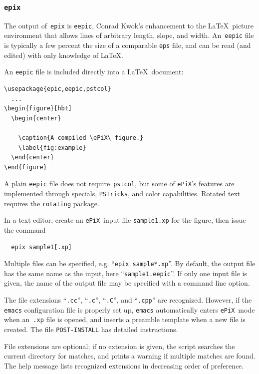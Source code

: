 \documentclass[12pt]{report}
\newcommand{\code}[1]{\texttt{#1}}
\newcommand{\filename}[1]{\texttt{#1}}
\newcommand{\ePiX}{\code{ePiX}}
\begin{document}
\subsubsection*{\code{epix}}

The output of~\code{epix} is \filename{eepic}, Conrad Kwok's
enhancement to the \LaTeX\ picture environment that allows lines of
arbitrary length, slope, and width. An~\filename{eepic} file is
typically a few percent the size of a comparable \filename{eps} file,
and can be read (and edited) with only knowledge of \LaTeX.

An \filename{eepic} file is included directly into a \LaTeX\ document:
\begin{verbatim}
\usepackage{epic,eepic,pstcol}
  ...
\begin{figure}[hbt]
  \begin{center}
    
    \caption{A compiled \ePiX\ figure.}
    \label{fig:example}
  \end{center}
\end{figure}
\end{verbatim}
A plain \filename{eepic} file does not require~\code{pstcol}, but
some of \ePiX's features are implemented through specials,
\code{PSTricks}, and color capabilities. Rotated text requires the
\code{rotating} package.

In a text editor, create an \ePiX\ input file \filename{sample1.xp}
for the figure, then issue the command
\begin{verbatim}
  epix sample1[.xp]
\end{verbatim}
Multiple files can be specified, e.g. ``\code{epix sample*.xp}''.  By
default, the output file has the same name as the input, here
``\filename{sample1.eepic}''. If only one input file is given, the
name of the output file may be specified with a command line option.

The file extensions ``\filename{.cc}'', ``\filename{.c}'',
``\filename{.C}'', and ``\filename{.cpp}'' are recognized. However, if
the \code{emacs} configuration file is properly set up, \code{emacs}
automatically enters \ePiX\ mode when an~\filename{.xp} file is
opened, and inserts a preamble template when a new file is created.
The file \filename{POST-INSTALL} has detailed instructions.

File extensions are optional; if no extension is given, the script
searches the current directory for matches, and prints a warning if
multiple matches are found. The help message lists recognized
extensions in decreasing order of preference.
\end{document}
